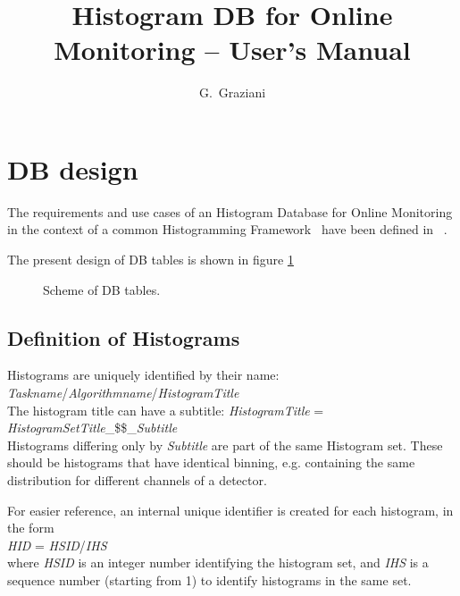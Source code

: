 \documentclass{lhcbnote}
\title{Histogram DB for Online Monitoring -- User's Manual}
\author{G.~Graziani}
\begin{document}
\maketitle


\begin{status}
\end{status}


\section{DB design}
The requirements and use cases of an Histogram Database for Online
Monitoring in the context of a common Histogramming Framework~\cite{genhisto}
have been defined in ~\cite{dbdesign}.

The present design of DB tables is shown in figure \ref{DBschema}


\begin{figure}[htb]
\centerline{}
\caption{Scheme of DB tables. }
\label{DBschema}
\end{figure}

\subsection{Definition of Histograms}
Histograms are uniquely identified by their name:\\
{\it Taskname}/{\it Algorithmname}/{\it HistogramTitle}\\
The histogram title can have a subtitle:
{\it HistogramTitle} = {\it HistogramSetTitle}\_\$\$\_{\it Subtitle}\\
Histograms differing only by {\it Subtitle} are part of the same
Histogram set. These should be histograms that have identical binning,
e.g. containing the same distribution for different channels of a detector.

For easier reference, an internal unique identifier is created for
each histogram, in the form\\
{\it HID} = {\it HSID}/{\it IHS}\\
where {\it HSID} is an integer number identifying the histogram set,
and {\it IHS} is a sequence number (starting from 1) to identify histograms in
the same set.
\end{document}
